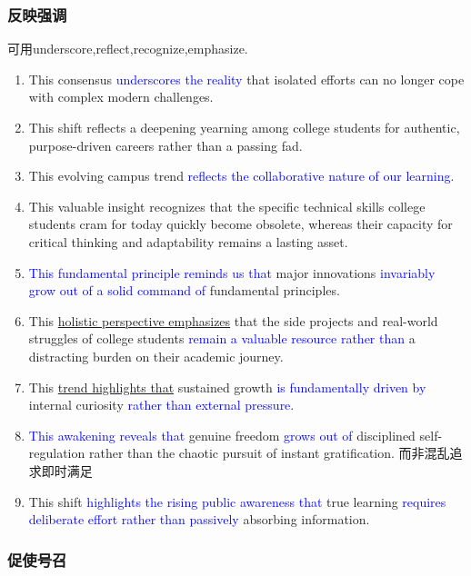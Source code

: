 \subsubsection{反映强调}
可用underscore,reflect,recognize,emphasize.
\begin{enumerate}
  \item This consensus \textcolor{blue}{underscores the reality} that isolated efforts can no longer cope with complex modern challenges.
  \item This shift reflects a deepening yearning among college students for authentic, purpose-driven careers rather than a passing fad.
  \item This evolving campus trend \textcolor{blue}{reflects the collaborative nature of our learning}.
  \item This valuable insight recognizes that the specific technical skills college students cram for today quickly become obsolete, whereas their capacity for critical thinking and adaptability remains a lasting asset.
  \item \textcolor{blue}{This fundamental principle reminds us that} major innovations \textcolor{blue}{invariably grow out of a solid command of} fundamental principles. 
  \item This \underline{holistic perspective emphasizes} that the side projects and real-world struggles of college students \textcolor{blue}{remain a valuable resource rather than} a distracting burden on their academic journey.
  \item This \underline{trend highlights that} sustained growth \textcolor{blue}{is fundamentally driven by} internal curiosity \textcolor{blue}{rather than external pressure}. 
  \item \textcolor{blue}{This awakening reveals that} genuine freedom \textcolor{blue}{grows out of} disciplined self-regulation rather than the chaotic pursuit of instant gratification. 而非混乱追求即时满足
  \item This shift \textcolor{blue}{highlights the rising public awareness that} true learning \textcolor{blue}{requires deliberate effort rather than passively} absorbing information.
\end{enumerate}

\subsubsection{促使号召}

